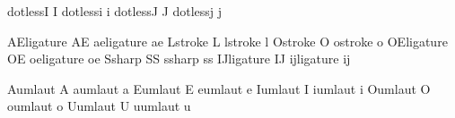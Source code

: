  dotlessI {I}  dotlessi {i}
 dotlessJ {J}  dotlessj {j}

 AEligature {AE}  aeligature {ae}
 Lstroke    {L}   lstroke    {l}
 Ostroke    {O}   ostroke    {o}
 OEligature {OE}  oeligature {oe}
 Ssharp     {SS}  ssharp     {ss}
 IJligature {IJ}  ijligature {ij}

 Aumlaut {A}  aumlaut {a}
 Eumlaut {E}  eumlaut {e}
 Iumlaut {I}  iumlaut {i}
 Oumlaut {O}  oumlaut {o}
 Uumlaut {U}  uumlaut {u}

\stopencoding
